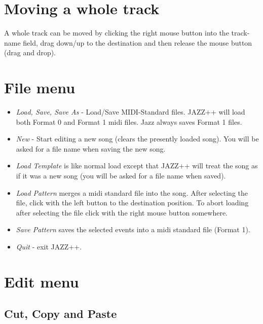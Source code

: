 \documentclass[letterpaper]{report}
\begin{document}
\section{Moving a whole track}

A whole track can be moved by clicking the right mouse button into the
track-name field, drag down/up to the destination and then release the
mouse button (drag and drop).


\section{File menu}\label{file}

\begin{itemize}
\item {\em Load, Save, Save As} - Load/Save MIDI-Standard files.
JAZZ++ will load both Format 0 and Format 1 midi files. Jazz always
saves Format 1 files.

\item {\em New} - Start editing a new song (clears the presently loaded
song). You will be asked for a file name when saving the new song.

\item {\em Load Template} is like normal load except that JAZZ++ will
treat the song as if it was a new song (you will be asked for a file
name when saved).

\item {\em Load Pattern} merges a midi standard file into the song. After
selecting the file, click with the left button to the destination position.
To abort loading after selecting the file click with the right mouse button
somewhere.

\item {\em Save Pattern} saves the selected events into a midi standard
file (Format 1).

\item {\em Quit} - exit JAZZ++.

\end{itemize}


\section{Edit menu}\label{twedit}


\subsection{Cut, Copy and Paste}\label{twclip}
\end{document}
